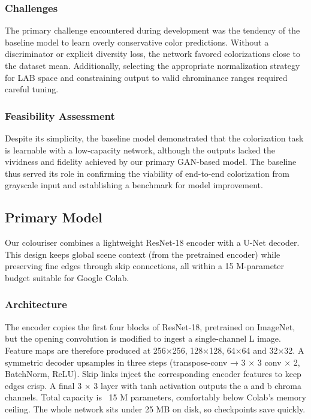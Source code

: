 \documentclass{article} %
\begin{document}
\subsubsection{Challenges}

The primary challenge encountered during development was the tendency of the baseline model to learn overly conservative color predictions. Without a discriminator or explicit 
diversity loss, the network favored colorizations close to the dataset mean. Additionally, selecting the appropriate normalization strategy for LAB space and constraining output to 
valid chrominance ranges required careful tuning.

\subsubsection{Feasibility Assessment}

Despite its simplicity, the baseline model demonstrated that the colorization task is learnable with a low-capacity network, although the outputs lacked the vividness and fidelity 
achieved by our primary GAN-based model. The baseline thus served its role in confirming the viability of end-to-end colorization from grayscale input and establishing a benchmark 
for model improvement.

\subsection{Primary Model}

Our colouriser combines a lightweight ResNet-18 encoder with a U-Net decoder. This design keeps global scene context (from the pretrained encoder) while preserving fine edges through skip connections, all within a 15 M-parameter budget suitable for Google Colab.

\subsubsection{Architecture}

The encoder copies the first four blocks of ResNet-18, pretrained on ImageNet, but the opening convolution is modified to ingest a single-channel L image. Feature maps are therefore produced at 256×256, 128×128, 64×64 and 32×32.
A symmetric decoder upsamples in three steps (transpose-conv → 3 × 3 conv × 2, BatchNorm, ReLU). Skip links inject the corresponding encoder features to keep edges crisp. A final 3 × 3 layer with tanh activation outputs the a and b chroma channels. Total capacity is ~15 M parameters, comfortably below Colab’s memory ceiling. The whole network sits under 25 MB on disk, so checkpoints save quickly.
\end{document}
